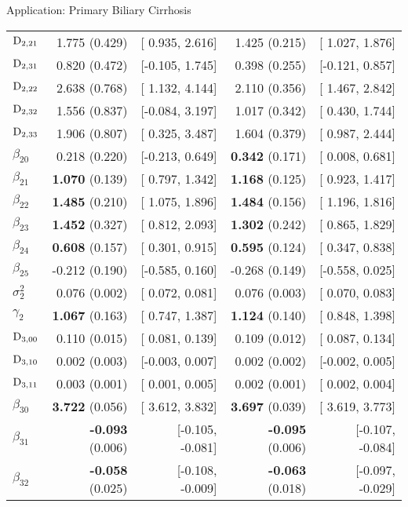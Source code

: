 \begin{chapter}{\label{cha:app-PBC}Application: Primary Biliary Cirrhosis}
\begin{table}[ht]
\begin{tabular}{lrrrr}
        $\mathrm{D}_{2,21}$ & 1.775 (0.429) & [ 0.935, 2.616] & 1.425 (0.215) & [ 1.027, 1.876] \\ 
        $\mathrm{D}_{2,31}$ & 0.820 (0.472) & [-0.105, 1.745] & 0.398 (0.255) & [-0.121, 0.857] \\ 
        $\mathrm{D}_{2,22}$ & 2.638 (0.768) & [ 1.132, 4.144] & 2.110 (0.356) & [ 1.467, 2.842] \\ 
        $\mathrm{D}_{2,32}$ & 1.556 (0.837) & [-0.084, 3.197] & 1.017 (0.342) & [ 0.430, 1.744] \\ 
        $\mathrm{D}_{2,33}$ & 1.906 (0.807) & [ 0.325, 3.487] & 1.604 (0.379) & [ 0.987, 2.444] \\ 
        $\beta_{20}$ &  0.218 (0.220) & [-0.213, 0.649] &  \textbf{0.342} (0.171) & [ 0.008, 0.681] \\ 
        $\beta_{21}$ &  \textbf{1.070} (0.139) & [ 0.797, 1.342] &  \textbf{1.168} (0.125) & [ 0.923, 1.417] \\ 
        $\beta_{22}$ &  \textbf{1.485} (0.210) & [ 1.075, 1.896] &  \textbf{1.484} (0.156) & [ 1.196, 1.816] \\ 
        $\beta_{23}$ &  \textbf{1.452} (0.327) & [ 0.812, 2.093] &  \textbf{1.302} (0.242) & [ 0.865, 1.829] \\ 
        $\beta_{24}$ &  \textbf{0.608} (0.157) & [ 0.301, 0.915] &  \textbf{0.595} (0.124) & [ 0.347, 0.838] \\ 
        $\beta_{25}$ & -0.212 (0.190) & [-0.585, 0.160] & -0.268 (0.149) & [-0.558, 0.025] \\ 
        $\sigma^2_2$ &  0.076 (0.002) & [ 0.072, 0.081] &  0.076 (0.003) & [ 0.070, 0.083] \\ 
        $\gamma_2$ &  \textbf{1.067} (0.163) & [ 0.747, 1.387] &  \textbf{1.124} (0.140) & [ 0.848, 1.398] \\ 
        \hdashline
        $\mathrm{D}_{3,00}$ & 0.110 (0.015) & [ 0.081, 0.139] & 0.109 (0.012) & [ 0.087, 0.134] \\ 
        $\mathrm{D}_{3,10}$ & 0.002 (0.003) & [-0.003, 0.007] & 0.002 (0.002) & [-0.002, 0.005] \\ 
        $\mathrm{D}_{3,11}$ & 0.003 (0.001) & [ 0.001, 0.005] & 0.002 (0.001) & [ 0.002, 0.004] \\ 
        $\beta_{30}$ &  \textbf{3.722} (0.056) & [ 3.612,  3.832] & \textbf{ 3.697} (0.039) & [ 3.619,  3.773] \\ 
        $\beta_{31}$ & \textbf{-0.093} (0.006) & [-0.105, -0.081] & \textbf{-0.095} (0.006) & [-0.107, -0.084] \\ 
        $\beta_{32}$ & \textbf{-0.058} (0.025) & [-0.108, -0.009] & \textbf{-0.063} (0.018) & [-0.097, -0.029] \\ 

\end{tabular}
\end{table}
\end{chapter}
